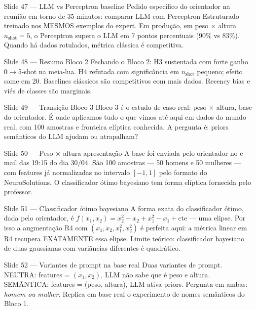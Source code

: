 \documentclass[aspectratio=169,10pt]{beamer}
\begin{document}
\begin{frame}{Slide 47 --- LLM vs Perceptron baseline}
\footnotesize
Pedido espec\'ifico do orientador na reuni\~ao em torno de 35 minutos: comparar LLM com Perceptron Estruturado treinado nos MESMOS exemplos do expert. Em produ\c{c}\~ao, em peso $\times$ altura $n_{\text{shot}}=5$, o Perceptron supera o LLM em 7 pontos percentuais (90\% vs 83\%). Quando h\'a dados rotulados, m\'etrica cl\'assica \'e competitiva.
\end{frame}

\begin{frame}{Slide 48 --- Resumo Bloco 2}
\footnotesize
Fechando o Bloco 2: H3 sustentada com forte ganho 0$\to$5-shot na meia-lua. H4 refutada com signific\^ancia em $n_{\text{shot}}$ pequeno; efeito some em 20. Baselines cl\'assicos s\~ao competitivos com mais dados. Recency bias e vi\'es de classes s\~ao marginais.
\end{frame}

\begin{frame}{Slide 49 --- Transi\c{c}\~ao Bloco 3}
\footnotesize
Bloco 3 \'e o estudo de caso real: peso $\times$ altura, base do orientador. \'E onde aplicamos tudo o que vimos at\'e aqui em dados do mundo real, com 100 amostras e fronteira el\'iptica conhecida. A pergunta \'e: priors sem\^anticos do LLM ajudam ou atrapalham?
\end{frame}

\begin{frame}{Slide 50 --- Peso $\times$ altura apresenta\c{c}\~ao}
\footnotesize
A base foi enviada pelo orientador no e-mail das 19:15 do dia 30/04. S\~ao 100 amostras --- 50 homens e 50 mulheres --- com features j\'a normalizadas no intervalo $[-1, 1]$ pelo formato do NeuroSolutions. O classificador \'otimo bayesiano tem forma el\'iptica fornecida pelo professor.
\end{frame}

\begin{frame}{Slide 51 --- Classificador \'otimo bayesiano}
\footnotesize
A forma exata do classificador \'otimo, dada pelo orientador, \'e $f(x_1, x_2) = x_2^2 - x_2 + x_1^2 - x_1 + \text{cte}$ --- uma elipse. Por isso a augmenta\c{c}\~ao R4 com $(x_1, x_2, x_1^2, x_2^2)$ \'e perfeita aqui: a m\'etrica linear em R4 recupera EXATAMENTE essa elipse. Limite te\'orico: classificador bayesiano de duas gaussianas com vari\^ancias diferentes \'e quadr\'atico.
\end{frame}

\begin{frame}{Slide 52 --- Variantes de prompt na base real}
\footnotesize
Duas variantes de prompt. NEUTRA: features = $(x_1, x_2)$, LLM n\~ao sabe que \'e peso e altura. SEM\^ANTICA: features = (peso, altura), LLM ativa priors. Pergunta em ambas: \emph{homem ou mulher}. Replica em base real o experimento de nomes sem\^anticos do Bloco 1.
\end{frame}
\end{document}
